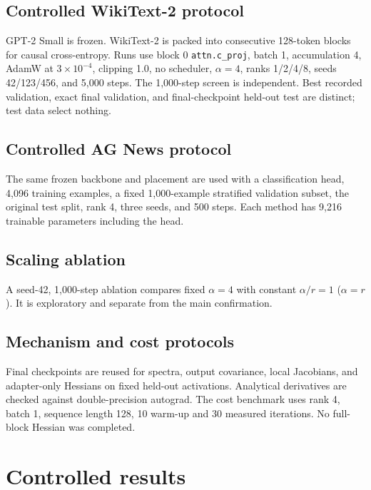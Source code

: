 \documentclass[11pt]{article}
\begin{document}
\subsection{Controlled WikiText-2 protocol} GPT-2 Small is frozen. WikiText-2 is packed into consecutive 128-token blocks for causal cross-entropy. Runs use block 0 \texttt{attn.c\_proj}, batch 1, accumulation 4, AdamW at $3\times10^{-4}$, clipping 1.0, no scheduler, $\alpha=4$, ranks 1/2/4/8, seeds 42/123/456, and 5,000 steps. The 1,000-step screen is independent. Best recorded validation, exact final validation, and final-checkpoint held-out test are distinct; test data select nothing.

\subsection{Controlled AG News protocol} The same frozen backbone and placement are used with a classification head, 4,096 training examples, a fixed 1,000-example stratified validation subset, the original test split, rank 4, three seeds, and 500 steps. Each method has 9,216 trainable parameters including the head.

\subsection{Scaling ablation} A seed-42, 1,000-step ablation compares fixed $\alpha=4$ with constant $\alpha/r=1$ ($\alpha=r$). It is exploratory and separate from the main confirmation.

\subsection{Mechanism and cost protocols} Final checkpoints are reused for spectra, output covariance, local Jacobians, and adapter-only Hessians on fixed held-out activations. Analytical derivatives are checked against double-precision autograd. The cost benchmark uses rank 4, batch 1, sequence length 128, 10 warm-up and 30 measured iterations. No full-block Hessian was completed.

\FloatBarrier\section{Controlled results}
\end{document}
